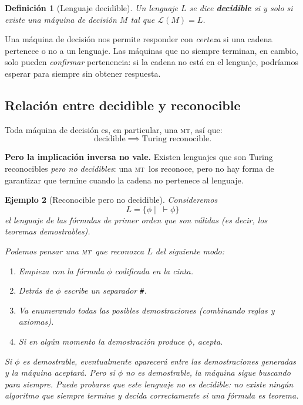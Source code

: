 \documentclass[11pt,a4paper]{article}
\theoremstyle{definicion}
\newtheorem{definicion}{Definición}[section]
\newtheorem{ejemplo}[definicion]{Ejemplo}
\newcommand{\MT}{\textsc{mt}}
\begin{document}
\begin{definicion}[Lenguaje decidible]
Un lenguaje $L$ se dice \textbf{decidible} si y solo si existe una máquina de decisión $M$ tal que $\mathcal{L}(M) = L$.
\end{definicion}

\begin{idea}
Una máquina de decisión nos permite responder con \emph{certeza} si una cadena pertenece o no a un lenguaje. Las máquinas que no siempre terminan, en cambio, solo pueden \emph{confirmar} pertenencia: si la cadena no está en el lenguaje, podríamos esperar para siempre sin obtener respuesta.
\end{idea}

\subsection{Relación entre decidible y reconocible}

Toda máquina de decisión es, en particular, una \MT, así que:
\[
\text{decidible} \implies \text{Turing reconocible}.
\]

\textbf{Pero la implicación inversa no vale.} Existen lenguajes que son Turing reconocibles \emph{pero no decidibles}: una \MT\ los reconoce, pero no hay forma de garantizar que termine cuando la cadena no pertenece al lenguaje.

\begin{ejemplo}[Reconocible pero no decidible]
Consideremos
\[
L = \{ \phi \mid \;\vdash \phi \}
\]
el lenguaje de las fórmulas de primer orden que son válidas (es decir, los teoremas demostrables).

Podemos pensar una \MT\ que reconozca $L$ del siguiente modo:
\begin{enumerate}
    \item Empieza con la fórmula $\phi$ codificada en la cinta.
    \item Detrás de $\phi$ escribe un separador \texttt{\#}.
    \item Va enumerando \emph{todas} las posibles demostraciones (combinando reglas y axiomas).
    \item Si en algún momento la demostración produce $\phi$, acepta.
\end{enumerate}

Si $\phi$ es demostrable, eventualmente aparecerá entre las demostraciones generadas y la máquina aceptará. Pero si $\phi$ \emph{no} es demostrable, la máquina sigue buscando para siempre. Puede probarse que este lenguaje \emph{no} es decidible: no existe ningún algoritmo que siempre termine y decida correctamente si una fórmula es teorema.
\end{ejemplo}
\end{document}
